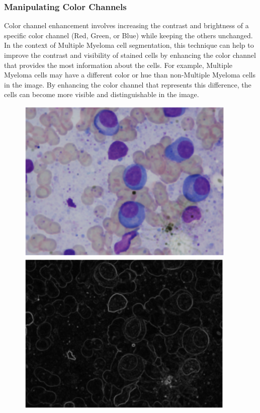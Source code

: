 \documentclass{article}
\begin{document}
\subsubsection{Manipulating Color Channels}

Color channel enhancement involves increasing the contrast and brightness of a specific color channel (Red, Green, or Blue) while keeping the others unchanged. In the context of Multiple Myeloma cell segmentation, this technique can help to improve the contrast and visibility of stained cells by enhancing the color channel that provides the most information about the cells. For example, Multiple Myeloma cells may have a different color or hue than non-Multiple Myeloma cells in the image. By enhancing the color channel that represents this difference, the cells can become more visible and distinguishable in the image.

\begin{figure}
  \centering
  \begin{minipage}{.5\textwidth}
    \centering
    \includegraphics[width=.5\linewidth]{5.png}
  \end{minipage}%
  \begin{minipage}{.4\textwidth}
    \centering
    \includegraphics[width=.63\linewidth]{6.png}
  \end{minipage}
\end{figure}
\end{document}
